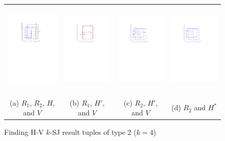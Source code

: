 \documentclass[sigconf]{acmart}
\def\figcapup{\vspace{-2mm}}
\def\figcapdown{\vspace{-2mm}}
\begin{document}
{{{\begin{figure}
    \begin{tabular}{cccc}
        \hspace{-5mm}
        \includegraphics[height=45mm]{./artwork/alg-ex2-a} &
        \hspace{-4mm}
        \includegraphics[height=45mm]{./artwork/alg-ex2-b} &
        \hspace{-4mm}
        \includegraphics[height=45mm]{./artwork/alg-ex2-c} &
        \hspace{-4mm}
        \includegraphics[height=45mm]{./artwork/alg-ex2-d} \\
        \hspace{-5mm} (a) $R_1$, $R_2$, $H$, and $V$ &
        \hspace{-4mm} (b) $R_1$, $H'$, and $V$ &
        \hspace{-4mm} (c) $R_2$, $H'$, and $V$ &
        \hspace{-4mm} (d) $R_2$ and $H^*$
    \end{tabular}
    \figcapup
    \caption{Finding H-V $k$-SJ result tuples of type 2 ($k = 4$)}
    \label{fig:hv:type2:ex}
    \figcapdown
\end{figure}


}}}
\end{document}

